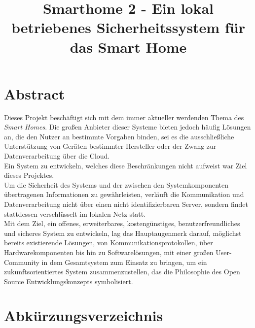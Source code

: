 \documentclass[a4paper,10pt,twocolumn]{article}
\title{Smarthome 2 - Ein lokal betriebenes Sicherheitssystem für das Smart Home}
\author{\editors}
\date{}
\begin{document}
\maketitle

\section*{Abstract}
Dieses Projekt beschäftigt sich mit dem immer aktueller werdenden Thema des \textit{Smart Homes}. Die großen Anbieter dieser Systeme bieten jedoch häufig Lösungen an, die den Nutzer an bestimmte Vorgaben binden, sei es die ausschließliche Unterstützung von Geräten bestimmter Hersteller oder der Zwang zur Datenverarbeitung über die Cloud.\\
Ein System zu entwickeln, welches diese Beschränkungen nicht aufweist war Ziel dieses Projektes.\\
Um die Sicherheit des Systems und der zwischen den Systemkomponenten übertragenen Informationen zu gewährleisten, verläuft die Kommunikation und Datenverarbeitung nicht über einen nicht identifizierbaren Server, sondern findet stattdessen verschlüsselt im lokalen Netz statt.\\
Mit dem Ziel, ein offenes, erweiterbares, kostengünstiges, benutzerfreundliches und sicheres System zu entwickeln, lag das Hauptaugenmerk darauf, möglichst bereits existierende Lösungen, von Kommunikationsprotokollen, über Hardwarekomponenten bis hin zu Softwarelösungen, mit einer großen User-Community in dem Gesamtsystem zum Einsatz zu bringen, um ein zukunftsorientiertes System zusammenzustellen, das die Philosophie des Open Source Entwicklungskonzepts symbolisiert. 


\section*{Abkürzungsverzeichnis}
\begin{acronym}[LONGEST]
\end{acronym}
\end{document}

